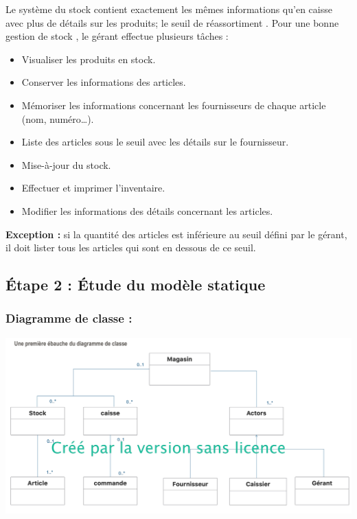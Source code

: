 \documentclass[french,10pt,a4paper]{report}
\begin{document}
Le système du stock contient exactement les mêmes informations qu’en caisse avec plus de détails sur les produits; le seuil de réassortiment . Pour une bonne gestion de stock , le gérant effectue plusieurs tâches :
\begin{itemize}
\item Visualiser les produits en stock.
\item Conserver les informations des articles.
\item Mémoriser les informations concernant les fournisseurs de chaque article (nom, numéro…).
\item Liste des articles sous le seuil avec les détails sur le fournisseur.
\item Mise-à-jour du stock.
\item Effectuer et imprimer l’inventaire.
\item Modifier les informations des détails concernant les articles.
\end{itemize}
\textbf{Exception :} si la quantité des articles est inférieure au seuil défini par le gérant, il doit lister tous les articles qui sont en dessous de ce seuil.
\subsection{\textcolor{bb}{Étape 2 : Étude du modèle statique}}
\subsubsection{Diagramme de classe :}
\begin{center}
 \includegraphics[scale=0.22]{captures/g_it2_1.png}
\end{center}
\end{document}
